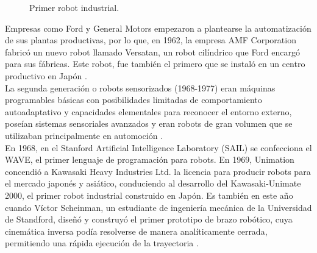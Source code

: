   \begin{figure}[h!]
    \begin{center}
      \subcapcentertrue
      \hspace{2mm}
    \end{center}
    \caption{Primer robot industrial.}
    \label{fig:primer_robot_industrial}
  \end{figure}
  
Empresas como Ford y General Motors empezaron a plantearse la automatización de sus plantas productivas, por lo que, en 1962, la empresa AMF Corporation fabricó un nuevo robot llamado Versatan, un robot cilíndrico que Ford encargó para sus fábricas. Este robot, fue también el primero que se instaló en un centro productivo en Japón \cite{Gasparetto19}. \\

La segunda generación o robots sensorizados (1968-1977) eran máquinas programables básicas con posibilidades limitadas de comportamiento autoadaptativo y capacidades elementales para reconocer el entorno externo, poseían sistemas sensoriales avanzados y eran robots de gran volumen que se utilizaban principalmente en automoción \cite{Zamalloa17}. \\

En 1968, en el Stanford Artificial Intelligence Laboratory (SAIL) se confecciona el WAVE, el primer lenguaje de programación para robots. En 1969, Unimation concendió a Kawasaki Heavy Industries Ltd. la licencia para producir robots para el mercado japonés y asiático, conduciendo al desarrollo del Kawasaki-Unimate 2000, el primer robot industrial construido en Japón. Es también en este año cuando Víctor Scheinman, un estudiante de ingeniería mecánica de la Universidad de Standford, diseñó y construyó el primer prototipo de brazo robótico, cuya cinemática inversa podía resolverse de manera analíticamente cerrada, permitiendo una rápida ejecución de la trayectoria \cite{Gasparetto19}. 

